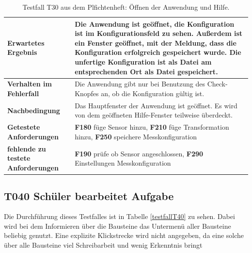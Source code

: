\documentclass[parskip=full]{scrartcl}
\begin{document}
\begin{table}[h]
\begin{tabular}{| p{4cm} | p{10cm} |}
	\\ \hline
	
	\textbf{Erwartetes Ergebnis}
	& 
	Die Anwendung ist geöffnet, die Konfiguration ist im Konfigurationsfeld zu sehen. Außerdem ist ein Fenster geöffnet, mit der Meldung, dass die Konfiguration erfolgreich gespeichert wurde.	Die unfertige Konfiguration ist als Datei am entsprechenden Ort als Datei gespeichert. 
	\\ \hline
			
	\textbf{Verhalten im Fehlerfall}
	& 
	Die Anwendung gibt nur bei Benutzung des Check-Knopfes an, ob die Konfiguration gültig ist.
	\\ \hline
	
	\textbf{Nachbedingung}
	& 
	Das Hauptfenster der Anwendung ist geöffnet. Es wird von dem geöffneten Hilfe-Fenster teilweise überdeckt.
	\\ \hline
	
	
	\textbf{Getestete Anforderungen}
	& 
	\textbf{F180} füge Sensor hinzu, \textbf{F210} füge Transformation hinzu, \textbf{F250} speichere Messkonfiguration
	\\ \hline
	\textbf{fehlende zu testete Anforderungen}
	& 
	\textbf{F190} prüfe ob Sensor angeschlossen, \textbf{F290} Einstellungen Messkonfiguration 
	\\ \hline
	
	
\end{tabular}
\caption{Testfall T30 aus dem Plfichtenheft: Öffnen der Anwendung und Hilfe.}
\label{testfallT30}
\end{table}



\subsection{\textbf{T040} Schüler bearbeitet Aufgabe}

Die Durchführung dieses Testfalles ist in Tabelle \ref{testfallT40} zu sehen. Dabei wird bei dem Informieren über die Bausteine das Untermenü aller Bausteine beliebig genutzt. Eine explizite Klickstrecke wird nicht angegeben, da eine solche über alle Bausteine viel Schreibarbeit und wenig Erkenntnis bringt
\end{document}
